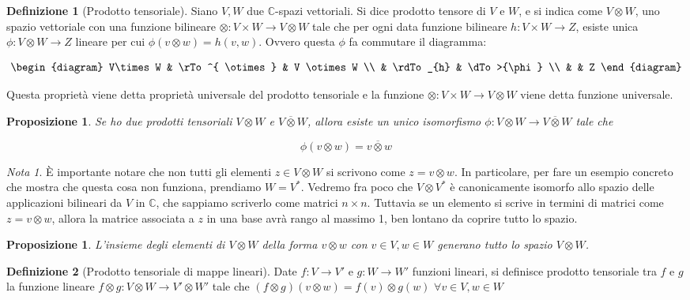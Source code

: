 \documentclass[11pt]{article}
\theoremstyle{plain}
\newtheorem{prop}[thm]{Proposizione}
\theoremstyle{definition}
\newtheorem{defn}{Definizione}[section]
\theoremstyle{remark}
\newtheorem*{note}{Nota}
\newcommand{\C}{\mathbb{C}}
\newcommand{\tridiag}[6]{
	\[
	  \begin{diagram}
	  #1 & \rTo^{#2}  & #3        \\
	     & \rdTo_{#6} & \dTo>{#4}   \\
	     &          & #5
	  \end{diagram}
	\]
}
\begin{document}
\begin{defn}[Prodotto tensoriale]
   Siano $V, W$ due $\mathbb{C}$-spazi vettoriali. Si dice prodotto tensore di $V$ e $W$, 
   e si indica come $V\otimes W$, uno spazio vettoriale con una funzione bilineare 
   $\otimes: V \times W \to V\otimes W$ tale che per ogni data funzione bilineare $h: V\times W \to  Z$,
   esiste unica $\phi: V\otimes W \to Z$ lineare per cui $\phi(v \otimes w)=h(v,w)$. Ovvero questa $\phi$ fa commutare il diagramma:
   \tridiag{V\times W}{ \otimes }{V \otimes W}{\phi}{Z}{h}
   Questa proprietà viene detta proprietà universale del prodotto tensoriale e la funzione $\otimes: V \times W \to V\otimes W$
   viene detta funzione universale.
\label{defn:prodotto tensoriale}
\end{defn}


\begin{prop}
Se ho due prodotti tensoriali $V \otimes W$ e $V \overline{\otimes} W$, allora esiste un unico isomorfismo 
$\phi: V \otimes W \to V \overline{\otimes} W$ tale che

\[ \phi (v\otimes w) = v \overline{\otimes} w\]
\end{prop}


\begin{note}
\`E importante notare che non tutti gli elementi $z \in V \otimes W$ si scrivono come $z = v \otimes w$. In particolare, per fare un esempio concreto che mostra che questa cosa non funziona, prendiamo $W = V^*$. Vedremo fra poco che $V\otimes V^*$ è canonicamente isomorfo allo spazio delle applicazioni bilineari da $V$ in $\C$, che sappiamo scriverlo come matrici $n\times n$. Tuttavia se un elemento si scrive in termini di matrici come $z = v\otimes w$, allora la matrice associata a $z$ in una base avrà rango al massimo 1, ben lontano da coprire tutto lo spazio.
\end{note}


\begin{prop}
L'insieme degli elementi di $V\otimes W$ della forma $v\otimes w$ con $v\in V, w\in W$ generano tutto lo spazio $V\otimes W$.
\end{prop}


\begin{defn}[Prodotto tensoriale di mappe lineari]
Date $f:V \to V'$ e $g:W \to W'$ funzioni lineari, si definisce prodotto tensoriale tra $f$ e $g$ la funzione lineare $f \otimes g : V \otimes W \to V' \otimes W'$ tale che $(f \otimes g)(v \otimes w)=f(v) \otimes g(w)$ $\forall v\in V, w\in W$

\end{defn}
\end{document}
